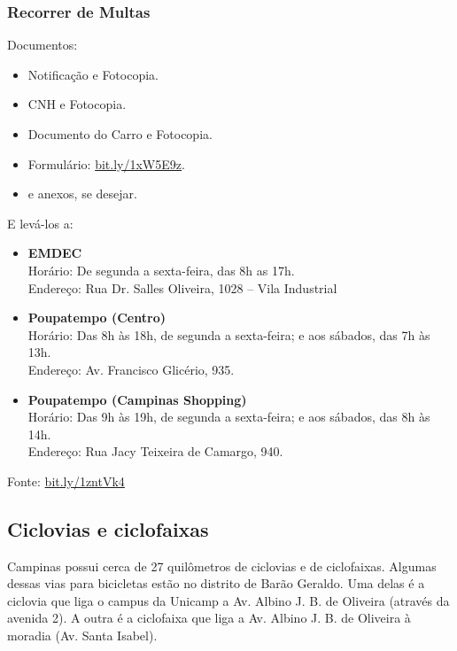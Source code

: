 \subsubsection{Recorrer de Multas}

Documentos:
\begin{itemize}
    \item Notificação e Fotocopia.
    \item CNH e Fotocopia.
    \item Documento do Carro e Fotocopia.
    \item Formulário: \url{bit.ly/1xW5E9z}.
    \item e anexos, se desejar.
\end{itemize}

E levá-los a:
\begin{itemize}
    \item \textbf{EMDEC}
        \\Horário: De segunda a sexta-feira, das 8h as 17h.
        \\Endereço: Rua Dr. Salles Oliveira, 1028 -- Vila Industrial

    \item \textbf{Poupatempo (Centro)}
        \\Horário: Das 8h às 18h, de segunda a sexta-feira;
                    e aos sábados, das 7h às 13h.
        \\Endereço: Av. Francisco Glicério, 935.

    \item \textbf{Poupatempo (Campinas Shopping)}
        \\Horário: Das 9h às 19h, de segunda a sexta-feira;
                    e aos sábados, das 8h às 14h.
        \\Endereço: Rua Jacy Teixeira de Camargo, 940.
\end{itemize}

Fonte:
\url{bit.ly/1zntVk4}

\subsection{Ciclovias e ciclofaixas}

Campinas possui cerca de 27 quilômetros de ciclovias e de ciclofaixas. Algumas
dessas vias para bicicletas estão no distrito de Barão Geraldo. Uma delas é a
ciclovia que liga o campus da Unicamp a Av. Albino J. B. de Oliveira (através
da avenida 2). A outra é a ciclofaixa que liga a Av. Albino J. B. de Oliveira
à moradia (Av. Santa Isabel).

